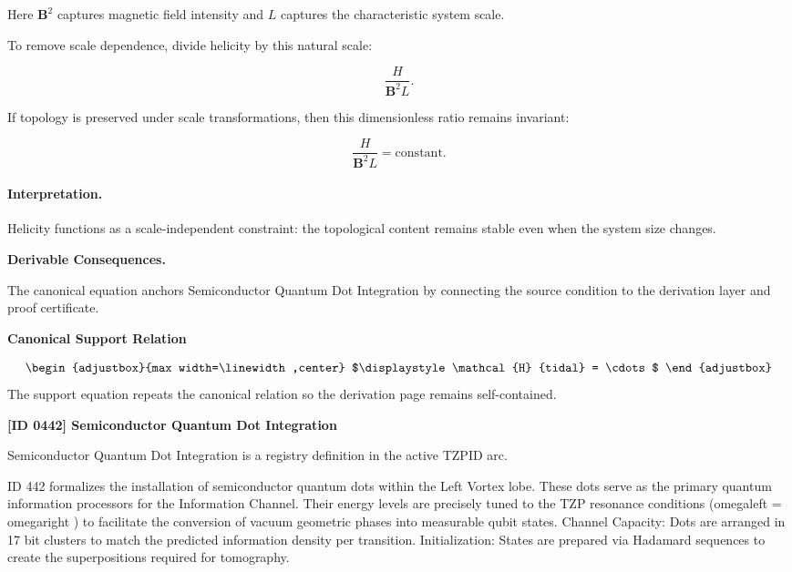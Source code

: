 Here $\mathbf{B}^2$ captures magnetic field intensity and $L$ captures the characteristic system scale.

To remove scale dependence, divide helicity by this natural scale:

\begin{equation}
\frac{H}{\mathbf{B}^2L}.
\end{equation}

If topology is preserved under scale transformations, then this dimensionless ratio remains invariant:

\begin{equation}
\boxed{
\frac{H}{\mathbf{B}^2 L}
=
\mathrm{constant}.
}
\end{equation}

\paragraph{Interpretation.}
Helicity functions as a scale-independent constraint: the topological content remains stable even when the system size changes.

\par\vspace{0.35em}
\noindent\textbf{Derivable Consequences.}\quad
\begingroup
\footnotesize
\raggedright
The canonical equation anchors Semiconductor Quantum Dot Integration by connecting the source condition to the derivation layer and proof certificate.
\par\endgroup

\noindent\textbf{Canonical Support Relation}\par
\[
\begin{adjustbox}{max width=\linewidth,center}
$\displaystyle
\mathcal{H} {tidal} = \cdots
$
\end{adjustbox}
\]
\noindent The support equation repeats the canonical relation so the derivation page remains self-contained.\par

\clearpage
\noindent\textbf{[ID 0442] Semiconductor Quantum Dot Integration}\par
\vspace{0.35em}
\begingroup\small
{}
Semiconductor Quantum Dot Integration is a registry definition in the active TZPID arc.

ID 442 formalizes the installation of semiconductor quantum dots within the Left Vortex lobe. These dots serve as the primary quantum information processors for the Information Channel. Their energy levels are precisely tuned to the TZP resonance conditions (omegaleft = omegaright ) to facilitate the conversion of vacuum geometric phases into measurable qubit states. Channel Capacity: Dots are arranged in 17 bit clusters to match the predicted information density per transition. Initialization: States are prepared via Hadamard sequences to create the superpositions required for tomography.

